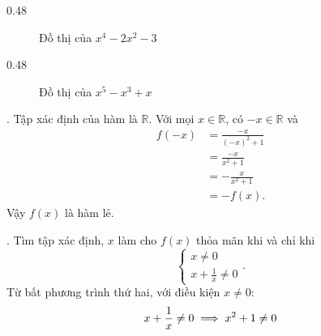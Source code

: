 {
   \begin{minipageindent}{0.48\textwidth}
      \begin{figure}[H]
         \centering
         \caption{Đồ thị của $x^{4} - 2 x^{2} - 3$}
      \end{figure}
   \end{minipageindent}
   \hfill
   \begin{minipageindent}{0.48\textwidth}
      \begin{figure}[H]
         \centering
         \caption{Đồ thị của $x^{5} - x^{3} + x$}
      \end{figure}
   \end{minipageindent}
}

. Tập xác định của hàm là $\mathbb{R}$. Với mọi $x \in \mathbb{R}$, có $-x \in \mathbb{R}$ và
\begin{align*}
   f(-x) &= \frac{-x}{(-x)^2 + 1}\\
   &= \frac{-x}{x^2 + 1}\\
   &= -\frac{x}{x^2 + 1}\\
   &= -f(x).
\end{align*}
Vậy $f(x)$ là hàm lẻ.

. Tìm tập xác định, $x$ làm cho $f(x)$ thỏa mãn khi và chỉ khi
\begin{equation*}
   \begin{cases}
      x \neq 0 \\
      x + \frac{1}{x} \neq 0
   \end{cases}.
\end{equation*}
Từ bất phương trình thứ hai, với điều kiện $x \neq 0$:
\begin{equation*}
   x + \frac{1}{x} \neq 0 \\
   \implies x^2 + 1 \neq 0
\end{equation*}